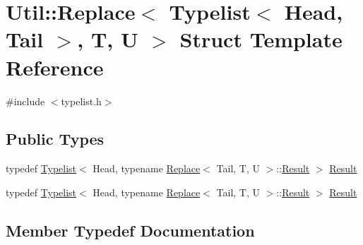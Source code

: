 \hypertarget{structUtil_1_1TL_1_1Replace_3_01Typelist_3_01Head_00_01Tail_01_4_00_01T_00_01U_01_4}{}\section{Util\+:\+:Replace$<$ Typelist$<$ Head, Tail $>$, T, U $>$ Struct Template Reference}
\label{structUtil_1_1TL_1_1Replace_3_01Typelist_3_01Head_00_01Tail_01_4_00_01T_00_01U_01_4}


{\ttfamily \#include $<$typelist.\+h$>$}

\subsection*{Public Types}
\begin{DoxyCompactItemize}
\item 
typedef \mbox{\hyperlink{structUtil_1_1Typelist}{Typelist}}$<$ Head, typename \mbox{\hyperlink{structUtil_1_1TL_1_1Replace}{Replace}}$<$ Tail, T, U $>$\+::\mbox{\hyperlink{structUtil_1_1TL_1_1Replace_3_01Typelist_3_01Head_00_01Tail_01_4_00_01T_00_01U_01_4_a218cadcba3503c01d97b4a6d4e65982c}{Result}} $>$ \mbox{\hyperlink{structUtil_1_1TL_1_1Replace_3_01Typelist_3_01Head_00_01Tail_01_4_00_01T_00_01U_01_4_a218cadcba3503c01d97b4a6d4e65982c}{Result}}
\item 
typedef \mbox{\hyperlink{structUtil_1_1Typelist}{Typelist}}$<$ Head, typename \mbox{\hyperlink{structUtil_1_1TL_1_1Replace}{Replace}}$<$ Tail, T, U $>$\+::\mbox{\hyperlink{structUtil_1_1TL_1_1Replace_3_01Typelist_3_01Head_00_01Tail_01_4_00_01T_00_01U_01_4_a218cadcba3503c01d97b4a6d4e65982c}{Result}} $>$ \mbox{\hyperlink{structUtil_1_1TL_1_1Replace_3_01Typelist_3_01Head_00_01Tail_01_4_00_01T_00_01U_01_4_a218cadcba3503c01d97b4a6d4e65982c}{Result}}
\end{DoxyCompactItemize}


\subsection{Member Typedef Documentation}
\mbox{\label{structUtil_1_1TL_1_1Replace_3_01Typelist_3_01Head_00_01Tail_01_4_00_01T_00_01U_01_4_a218cadcba3503c01d97b4a6d4e65982c}} 
